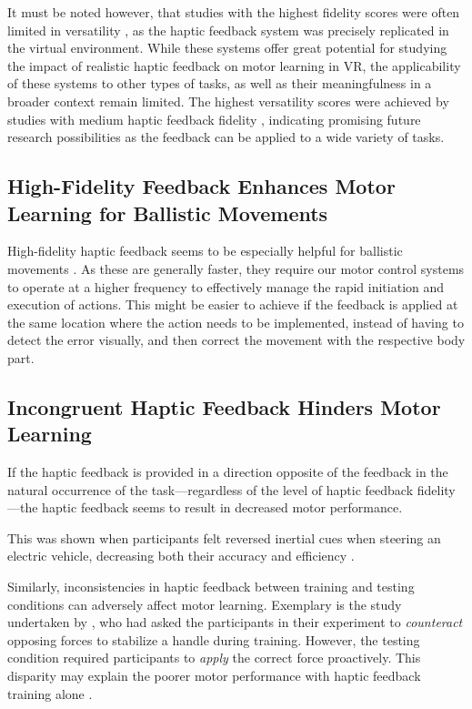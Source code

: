 It must be noted however, that studies with the highest fidelity scores were often limited in versatility \cite{Huang2007, LeeH2014, Vaghela2021}, as the haptic feedback system was precisely replicated in the virtual environment. While these systems offer great potential for studying the impact of realistic haptic feedback on motor learning in VR, the applicability of these systems to other types of tasks, as well as their meaningfulness in a broader context remain limited.
The highest versatility scores were achieved by studies with medium haptic feedback fidelity \cite{Yang2023, McAnally2023}, indicating promising future research possibilities as the feedback can be applied to a wide variety of tasks.

\subsection{High-Fidelity Feedback Enhances Motor Learning for Ballistic Movements}

High-fidelity haptic feedback seems to be especially helpful for ballistic movements \cite{Wall2000}. As these are generally faster, they require our motor control systems to operate at a higher frequency to effectively manage the rapid initiation and execution of actions. This might be easier to achieve if the feedback is applied at the same location where the action needs to be implemented, instead of having to detect the error visually, and then correct the movement with the respective body part. 


\subsection{Incongruent Haptic Feedback Hinders Motor Learning}
If the haptic feedback is provided in a direction opposite of the feedback in the natural occurrence of the task---regardless of the level of haptic feedback fidelity---the haptic feedback seems to result in decreased motor performance. 

This was shown when participants felt reversed inertial cues when steering an electric vehicle, decreasing both their accuracy and efficiency \cite{Macuga2019}. 

Similarly, inconsistencies in haptic feedback between training and testing conditions can adversely affect motor learning. Exemplary is the study undertaken by \cite{Morris2007}, who had asked the participants in their experiment to \textit{counteract} opposing forces to stabilize a handle during training. However, the testing condition required participants to \textit{apply} the correct force proactively. This disparity may explain the poorer motor performance with haptic feedback training alone \cite{Morris2007}.

